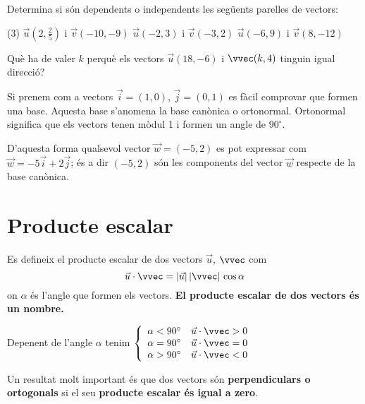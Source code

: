 \documentclass[11pt, a4paper, pdf]{article}
\begin{document}
 \begin{mylist}
 	\item Determina si són dependents o independents les següents parelles de vectors:
 	\begin{tasks}(3)
 		\task $\vec u \left(2, \frac{2}{5} \right)$	i 	 $\vec v(-10,-9)$
 		\task $\vec u \left(-2, 3\right)$	i 	 $\vec v(-3, 2)$
 		\task $\vec u \left(-6, 9 \right)$	i 	 $\vec v(8, -12)$
 	\end{tasks}
 	
 	\item Què ha de valer $k$ perquè els vectors $\vec u(18, -6)$ i $\vvec(k, 4)$ tinguin igual direcció?
 \end{mylist}
  
 \begin{theorybox}
 	Si prenem com a vectors $\vec i = (1, 0)$, $\vec j = (0,1)$ es fàcil comprovar que formen una base. Aquesta base s'anomena la base canònica o ortonormal. Ortonormal significa que els vectors tenen mòdul 1 i formen un angle de $90^\circ$.
 	
 	D'aquesta forma qualsevol vector $\vec w = (-5, 2)$ es pot expressar com $\vec w = -5 \vec i +  2\vec j$; és a dir $(-5, 2)$ són les components del vector $\vec w$ respecte de la base canònica.
 \end{theorybox}


 
 
 \section{Producte escalar}
 
 \begin{theorybox}[Definició]
 	Es defineix el producte escalar de dos vectors  $\vec u$, $\vvec$ com
 	\begin{equation}
 	\label{eq:dotproduct}
 	\vec u \cdot \vvec= |\vec u|\, |\vvec|\, \cos \alpha
 	\end{equation}
 	on $\alpha$ és l'angle que formen els vectors. \textbf{El producte escalar de dos vectors és un nombre.}
 	
 	Depenent de l'angle $\alpha$ tenim $\left\{ \begin{array}{ll} 
 	\alpha<90^\circ &   \vec u \cdot \vvec>0 \\ 
 	\alpha=90^\circ &   \vec u \cdot \vvec=0	\\
 	\alpha>90^\circ &  \vec u \cdot \vvec<0 
 	\end{array}\right.$
 	
 	Un resultat molt important és que dos vectors són \textbf{perpendiculars o ortogonals} si el seu \textbf{producte escalar és igual a zero}.		 
 \end{theorybox}
 
\end{document}
